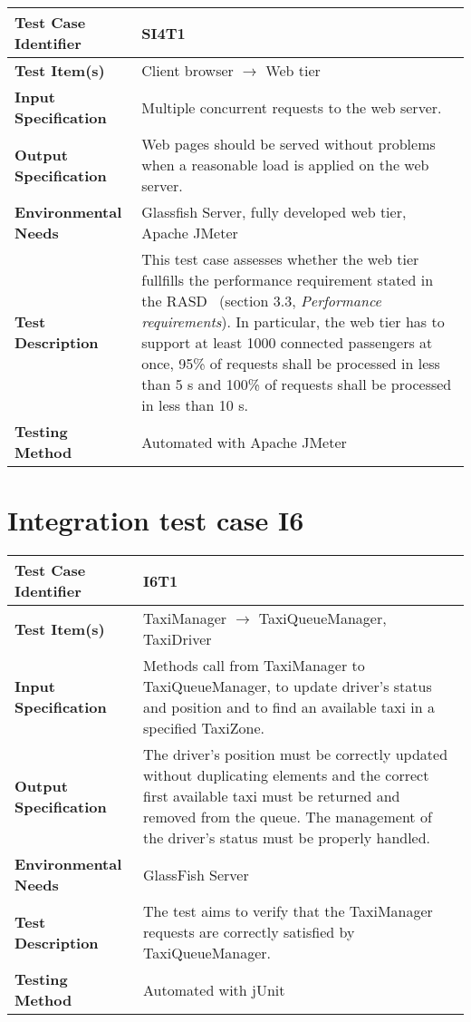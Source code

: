 \vspace{2em}

\noindent\begin{tabular}{l p{}}
    \hline
    \textbf{Test Case Identifier} & SI4T1\\
    \hline
    \textbf{Test Item(s)} & Client browser $\rightarrow$ Web tier\\
    \hline
    \textbf{Input Specification} & Multiple concurrent requests to the web server.\\
    \hline
    \textbf{Output Specification} & Web pages should be served without problems when a reasonable load is applied on the web server. \\
    \hline
    \textbf{Environmental Needs} & Glassfish Server, fully developed web tier, Apache JMeter\\
    \hline
    \textbf{Test Description} & This test case assesses whether the web tier fullfills the performance requirement stated in the RASD~\cite{mytaxi-rasd} (section 3.3, \emph{Performance requirements}). In particular, the web tier has to support at least 1000 connected passengers at once, 95\% of requests shall be processed in less than 5 s and 100\% of requests shall be processed in less than 10 s.\\
    \hline
    \textbf{Testing Method} & Automated with Apache JMeter \\
    \hline
\end{tabular}

\vspace{2em}

\section{Integration test case I6}

\begin{tabular}{l p{}}
    \hline
    \textbf{Test Case Identifier} & I6T1\\
    \hline
    \textbf{Test Item(s)} & TaxiManager $\rightarrow$ TaxiQueueManager, TaxiDriver \\
    \hline
    \textbf{Input Specification} & Methods call from TaxiManager to TaxiQueueManager, to update driver's status and position and to find an available taxi in a specified TaxiZone.\\
    \hline
    \textbf{Output Specification} & The driver's position must be correctly updated without duplicating elements and the correct first available taxi must be returned and removed from the queue. The management of the driver's status must be properly handled.\\
    \hline
    \textbf{Environmental Needs} & GlassFish Server\\
    \hline
    \textbf{Test Description} & The test aims to verify that the TaxiManager requests are correctly satisfied by TaxiQueueManager.\\
    \hline
    \textbf{Testing Method} & Automated with jUnit\\
    \hline
\end{tabular}

